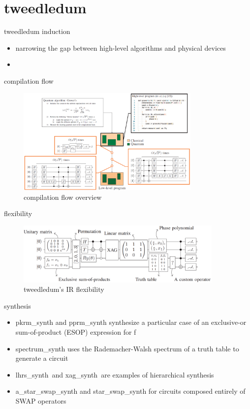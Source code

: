 \section{tweedledum}
\begin{frame}{tweedledum induction}  
  \begin{itemize}
    \item  narrowing the gap between high-level algorithms and physical devices
    \item 
  \end{itemize}
\end{frame}
\begin{frame}{compilation flow}
  \begin{figure}[htbq]
    \centering
    \includegraphics[width=0.8\textwidth]{figure/work_flow.png}
    \caption{compilation flow overview} 
    \label{fig-compilation}
  \end{figure}
\end{frame}
\begin{frame}{flexibility}
  \begin{figure}[htbq]
    \centering
    \includegraphics[width=0.9\textwidth]{figure/flex.png}
    \caption{tweedledum's IR flexibility} 
    \label{fig-flex}
  \end{figure}
\end{frame}
\begin{frame}{synthesis}
  \begin{itemize}
    \item pkrm\_synth and pprm\_synth synthesize a particular case of an exclusive-or sum-of-product (ESOP) expression for f
    \item spectrum\_synth uses the Rademacher-Walsh spectrum of a truth table to generate a circuit
    \item lhrs\_synth\ and xag\_synth\ are examples of hierarchical synthesis
    \item a\_star\_swap\_synth and star\_swap\_synth for circuits composed entirely of SWAP operators
  \end{itemize}  
\end{frame}
